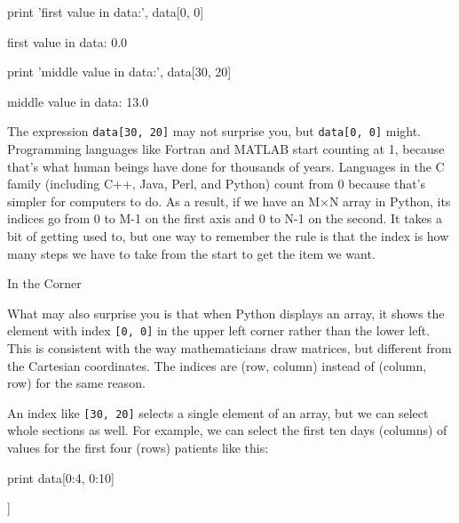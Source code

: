\documentclass{book}
\begin{document}
\begin{VerbIn}
print 'first value in data:', data[0, 0]
\end{VerbIn}

\begin{VerbOut}
first value in data: 0.0
\end{VerbOut}

\begin{VerbIn}
print 'middle value in data:', data[30, 20]
\end{VerbIn}

\begin{VerbOut}
middle value in data: 13.0
\end{VerbOut}

The expression \texttt{data{[}30, 20{]}} may not surprise you, but
\texttt{data{[}0, 0{]}} might. Programming languages like Fortran and
MATLAB start counting at 1, because that's what human beings have done
for thousands of years. Languages in the C family (including C++, Java,
Perl, and Python) count from 0 because that's simpler for computers to
do. As a result, if we have an M×N array in Python, its indices go from
0 to M-1 on the first axis and 0 to N-1 on the second. It takes a bit of
getting used to, but one way to remember the rule is that the index is
how many steps we have to take from the start to get the item we want.

\begin{swcbox}{In the Corner}

What may also surprise you is that when Python displays an array, it
shows the element with index \texttt{{[}0, 0{]}} in the upper left
corner rather than the lower left. This is consistent with the way
mathematicians draw matrices, but different from the Cartesian
coordinates. The indices are (row, column) instead of (column, row) for
the same reason.

\end{swcbox}

An index like \texttt{{[}30, 20{]}} selects a single element of an
array, but we can select whole sections as well. For example, we can
select the first ten days (columns) of values for the first four (rows)
patients like this:

\begin{VerbIn}
print data[0:4, 0:10]
\end{VerbIn}

\begin{VerbOut}
[[ 0.  0.  1.  3.  1.  2.  4.  7.  8.  3.]
 [ 0.  1.  2.  1.  2.  1.  3.  2.  2.  6.]
 [ 0.  1.  1.  3.  3.  2.  6.  2.  5.  9.]
 [ 0.  0.  2.  0.  4.  2.  2.  1.  6.  7.]]
\end{VerbOut}
\end{document}
